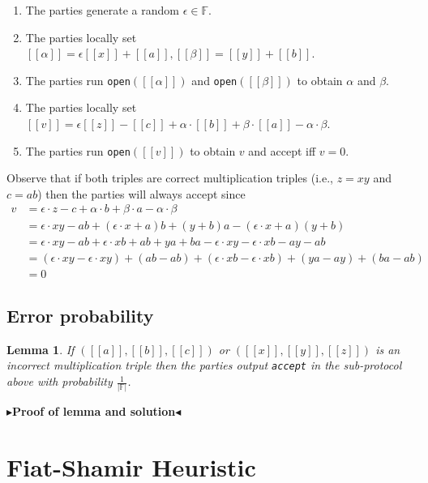 \documentclass[twoside,11pt,openright]{report}
\theoremstyle{definition}
\theoremstyle{plain}
\newtheorem{lemma}{Lemma}[section]
\newcommand{\todo}[1]{{\color[rgb]{.5,0,0}\textbf{$\blacktriangleright$#1$\blacktriangleleft$}}}
\begin{document}
\begin{enumerate}
  \item The parties generate a random $\epsilon \in \mathbb{F}$.
  \item The parties locally set $[[\alpha]] = \epsilon[[x]] + [[a]], [[\beta]] = [[y]] + [[b]]$.
  \item The parties run \texttt{open}$([[\alpha]])$ and \texttt{open}$([[\beta]])$ to obtain $\alpha$ and $\beta$.
  \item The parties locally set $[[v]] = \epsilon[[z]] - [[c]] + \alpha  \cdot [[b]] + \beta  \cdot [[a]] - \alpha  \cdot \beta$.
  \item The parties run \texttt{open}$([[v]])$ to obtain $v$ and accept iff $v = 0$.

\end{enumerate}
Observe that if both triples are correct multiplication triples (i.e., $z = xy$ and $c = ab$) then the parties will always accept since
\begin{align}
  v & = \epsilon \cdot z - c + \alpha \cdot b + \beta \cdot a - \alpha \cdot \beta                                            \\
    & = \epsilon \cdot xy - ab + (\epsilon \cdot x + a)b + (y + b)a - (\epsilon \cdot x + a)(y + b)                           \\
    & = \epsilon \cdot xy - ab + \epsilon \cdot xb + ab + ya + ba - \epsilon \cdot xy - \epsilon \cdot xb - ay - ab           \\
    & = (\epsilon \cdot xy - \epsilon \cdot xy) + (ab - ab) + (\epsilon \cdot xb - \epsilon \cdot xb) + (ya - ay) + (ba - ab) \\
    & = 0
\end{align}

\subsection{Error probability}

\begin{lemma}
  If $([[a]], [[b]], [[c]])$ or $([[x]], [[y]], [[z]])$ is an incorrect multiplication triple then the parties output \texttt{accept} in the sub-protocol above with probability $\frac{1}{|\mathbb{F}|}$.
\end{lemma}

\todo{Proof of lemma and solution}

\section{Fiat-Shamir Heuristic}
\label{sec:fiatshamir}
\end{document}
